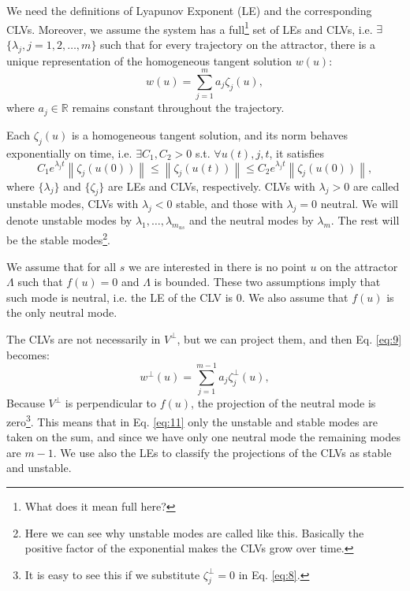 \documentclass[10pt,twoside,a4paper]{article} %
\newcommand{\norm}[1]{\left\|#1\right\|}
\begin{document}
We need the definitions of Lyapunov Exponent (LE) and the corresponding CLVs. Moreover, we assume the system has a full\footnote{What does it mean full here?} set of LEs and CLVs, i.e. $\exists$ $ \{\lambda_j, j=1,2,\ldots,m\}$ such that for every trajectory on the attractor, there is a unique representation of the homogeneous tangent solution $w(u)$:
\begin{equation}
  w(u) = \sum_{j=1}^m a_j\zeta_j(u),
  \label{eq:9}
\end{equation}
where $a_j\in \mathbb{R}$ remains constant throughout the trajectory.

Each $\zeta_j(u)$ is a homogeneous tangent solution, and its norm behaves exponentially on time, i.e. $\exists C_1, C_2 > 0$ s.t. $\forall u(t), j, t$, it satisfies
\begin{equation}
  C_1 e^{\lambda_jt}\norm{\zeta_j(u(0))} \leq \norm{\zeta_j(u(t))} \leq C_2 e^{\lambda_jt}\norm{\zeta_j(u(0))},
  \label{eq:10}
\end{equation}
where $\{\lambda_j\}$ and $\{\zeta_j\}$ are LEs and CLVs, respectively. CLVs with $\lambda_j>0$ are called unstable modes, CLVs with $\lambda_j<0$ stable, and those with $\lambda_j=0$ neutral. We will denote unstable modes by $\lambda_1,\ldots,\lambda_{m_{us}}$ and the neutral modes by $\lambda_m$. The rest will be the stable modes\footnote{Here we can see why unstable modes are called like this. Basically the positive factor of the exponential makes the CLVs grow over time.}.

We assume that for all $s$ we are interested in there is no point $u$ on the attractor $\Lambda$ such that $f(u)=0$ and $\Lambda$ is bounded. These two assumptions imply that such mode is neutral, i.e. the LE of the CLV is 0. We also assume that $f(u)$ is the only neutral mode.

The CLVs are not necessarily in $V^\perp$, but we can project them, and then Eq. \ref{eq:9} becomes:
\begin{equation}
  w^\perp(u) = \sum_{j=1}^{m-1} a_j\zeta_j^\perp(u),
  \label{eq:11}
\end{equation}
Because $V^\perp$ is perpendicular to $f(u)$, the projection of the neutral mode is zero\footnote{It is easy to see this if we substitute $\zeta_j^\perp = 0$ in Eq. \ref{eq:8}.}. This means that in Eq. \ref{eq:11} only the unstable and stable modes are taken on the sum, and since we have only one neutral mode the remaining modes are $m-1$. We use also the LEs to classify the projections of the CLVs as stable and unstable.
\end{document}
